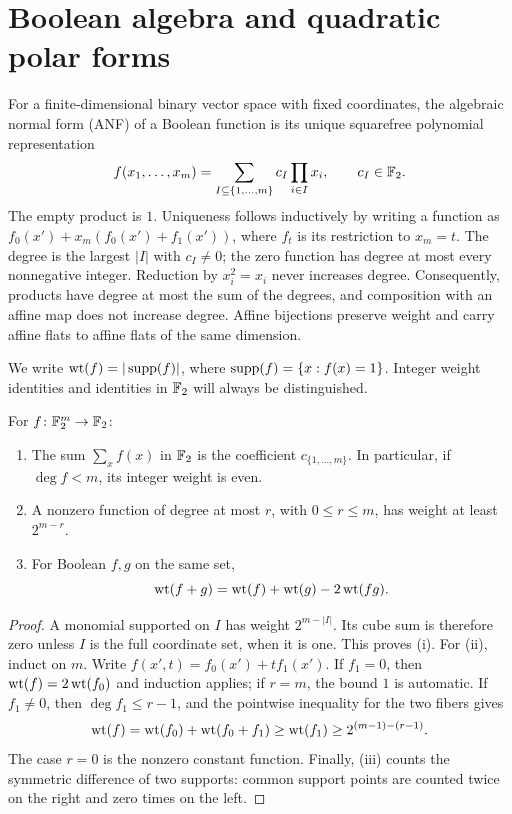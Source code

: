 \section{Boolean algebra and quadratic polar forms}\label{sec:anf}
For a finite-dimensional binary vector space with fixed coordinates, the algebraic normal form (ANF) of a Boolean function is its unique squarefree polynomial representation
\begin{equation}\label{eq:anf}
f(x_1,\ldots,x_m)=\sum_{I\subseteq\{1,\ldots,m\}}c_I\prod_{i\in I}x_i,
\qquad c_I\in\mathbb F_2.
\end{equation}
The empty product is $1$. Uniqueness follows inductively by writing a function as $f_0(x')+x_m(f_0(x')+f_1(x'))$, where $f_t$ is its restriction to $x_m=t$. The degree is the largest $|I|$ with $c_I\ne0$; the zero function has degree at most every nonnegative integer. Reduction by $x_i^2=x_i$ never increases degree. Consequently, products have degree at most the sum of the degrees, and composition with an affine map does not increase degree. Affine bijections preserve weight and carry affine flats to affine flats of the same dimension.

We write $\operatorname{wt}(f)=|\operatorname{supp}(f)|$, where $\operatorname{supp}(f)=\{x:f(x)=1\}$. Integer weight identities and identities in $\mathbb F_2$ will always be distinguished.

\begin{lemma}\label{lem:anf-basic}
For $f\colon\mathbb F_2^m\to\mathbb F_2$:
\begin{enumerate}[label=(\roman*)]
\item The sum $\sum_x f(x)$ in $\mathbb F_2$ is the coefficient $c_{\{1,\ldots,m\}}$. In particular, if $\deg f<m$, its integer weight is even.
\item A nonzero function of degree at most $r$, with $0\le r\le m$, has weight at least $2^{m-r}$.
\item For Boolean $f,g$ on the same set,
\[
\operatorname{wt}(f+g)=\operatorname{wt}(f)+\operatorname{wt}(g)-2\operatorname{wt}(fg).
\]
\end{enumerate}
\end{lemma}
\begin{proof}
A monomial supported on $I$ has weight $2^{m-|I|}$. Its cube sum is therefore zero unless $I$ is the full coordinate set, when it is one. This proves (i). For (ii), induct on $m$. Write $f(x',t)=f_0(x')+t f_1(x')$. If $f_1=0$, then $\operatorname{wt}(f)=2\operatorname{wt}(f_0)$ and induction applies; if $r=m$, the bound $1$ is automatic. If $f_1\ne0$, then $\deg f_1\le r-1$, and the pointwise inequality for the two fibers gives
\[
\operatorname{wt}(f)=\operatorname{wt}(f_0)+\operatorname{wt}(f_0+f_1)\ge\operatorname{wt}(f_1)
\ge2^{(m-1)-(r-1)}.
\]
The case $r=0$ is the nonzero constant function. Finally, (iii) counts the symmetric difference of two supports: common support points are counted twice on the right and zero times on the left.
\end{proof}

